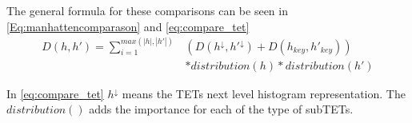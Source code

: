 	The general formula for these comparisons can be seen in \autoref{Eq:manhattencomparason} and \autoref{eq:compare_tet}
	\begin{equation}\label{eq:compare_tet}
	\begin{split}
	D(h,h') = \sum_{i=1}^{max(|h|,|h'|)} & (D(h^{\downarrow}, h'^{\downarrow})+ D(h_{key}, h'_{key}))  \\
	& * distribution(h) * distribution (h')
	\end{split}
	\end{equation}

	In \autoref{eq:compare_tet} $h^{\downarrow}$ means the TETs next level histogram representation. The $distribution()$ adds the importance for each of the type of subTETs.

